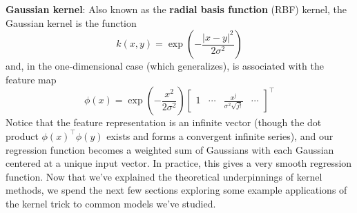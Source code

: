 \documentclass{article}
\begin{document}
\textbf{Gaussian kernel}: Also known as the \textbf{radial basis function} (RBF) kernel, the Gaussian kernel is the function
$$ k(x, y) = \exp \left( - \frac{| x - y |^2}{2 \sigma^2} \right) $$
\indent and, in the one-dimensional case (which generalizes), is associated with the feature map
$$ \phi(x) = \exp \left( - \frac{x^2}{2 \sigma^2} \right) \begin{bmatrix} 1 & \cdots & \frac{x^j}{\sigma^2 \sqrt{j!}} & \cdots \end{bmatrix}^\intercal $$
\indent Notice that the feature representation is an infinite vector (though the dot product $ \phi(x)^\intercal \phi(y) $ exists and forms a convergent infinite series), and our regression function becomes a weighted sum of Gaussians with each Gaussian centered at a unique input vector. In practice, this gives a very smooth regression function.
\newline
Now that we've explained the theoretical underpinnings of kernel methods, we spend the next few sections exploring some example applications of the kernel trick to common models we've studied.
\end{document}
